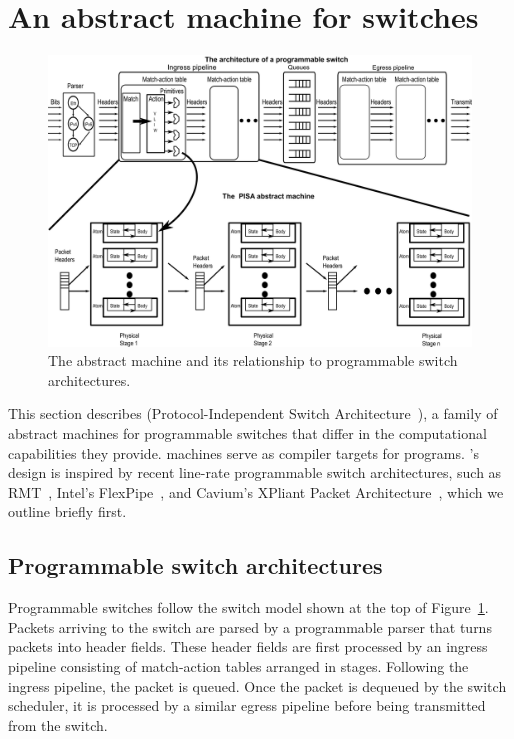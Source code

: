 \section{An abstract machine for switches}
\label{s:absmachine}

\begin{figure}[!t]
  \includegraphics[width=\textwidth]{pisa-fig.pdf}
  \caption{The \absmachine abstract machine and its relationship to
  programmable switch architectures.}
  \label{fig:switch}
\end{figure}

This section describes \absmachine (Protocol-Independent Switch
Architecture~\cite{nick_p4}), a family of abstract machines for programmable
switches that differ in the computational capabilities they provide.
\absmachine machines serve as compiler targets for \pktlanguage programs.
\absmachine's design is inspired by recent line-rate programmable switch
architectures, such as RMT~\cite{rmt}, Intel's FlexPipe~\cite{flexpipe}, and
Cavium's XPliant Packet Architecture~\cite{xpliant}, which we outline briefly
first.

\subsection{Programmable switch architectures}
Programmable switches follow the switch model shown at the top of
Figure~\ref{fig:switch}.  Packets arriving to the switch are parsed by a
programmable parser that turns packets into header fields. These header fields
are first processed by an ingress pipeline consisting of match-action tables
arranged in stages.  Following the ingress pipeline, the packet is queued. Once
the packet is dequeued by the switch scheduler, it is processed by a similar
egress pipeline before being transmitted from the switch.

